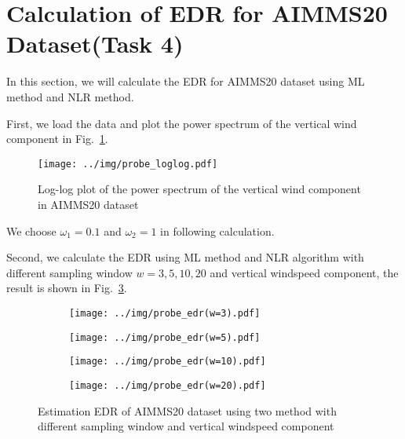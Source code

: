 \documentclass[runningheads]{llncs}
\begin{document}
\section{Calculation of EDR for AIMMS20 Dataset(Task 4)}

In this section, we will calculate the EDR for AIMMS20 dataset using ML method and NLR method.

First, we load the data and plot the power spectrum of the vertical wind component in Fig.~\ref{fig:4}.

\begin{figure}[!htbp]
    \centering
    \texttt{[image: ../img/probe\_loglog.pdf]}
    \caption{Log-log plot of the power spectrum of the vertical wind component in AIMMS20 dataset}
    \label{fig:4}
\end{figure}

We choose $\omega_1=0.1$ and $\omega_2=1$ in following calculation.

Second, we calculate the EDR using ML method and NLR algorithm with different sampling window $w=3,5,10,20$ and 
vertical windspeed component, the result is shown in Fig.~\ref{fig:6}.

\begin{figure}[!htbp]
    \centering
    \begin{subfigure}{.4\textwidth}
        \centering
        \texttt{[image: ../img/probe\_edr(w=3).pdf]}

        \label{fig:6a}
    \end{subfigure}
    \begin{subfigure}{.4\textwidth}
        \centering
        \texttt{[image: ../img/probe\_edr(w=5).pdf]}

    \end{subfigure}
    \begin{subfigure}{.4\textwidth}
        \centering
        \texttt{[image: ../img/probe\_edr(w=10).pdf]}

    \end{subfigure}
    \begin{subfigure}{.4\textwidth}
        \centering
        \texttt{[image: ../img/probe\_edr(w=20).pdf]}

    \end{subfigure}
    \caption{Estimation EDR of AIMMS20 dataset using two method with different sampling window and vertical windspeed component}
    \label{fig:6}
\end{figure}
\end{document}
